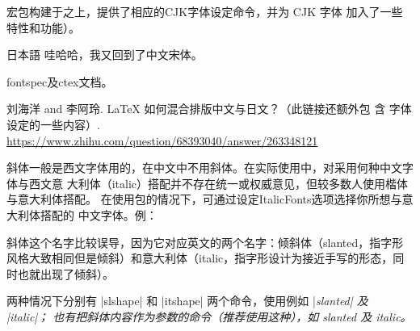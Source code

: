 宏包构建于之上，提供了相应的CJK字体设定命令，并为 CJK 字体
加入了一些特性和功能）。
\begin{texlist}


  \newCJKfontfamily{} %
  \gothic 日本語
  \songti 哇哈哈，我又回到了中文宋体。
\end{texlist}

\begin{reference}
  \item fontspec及ctex文档。
  \item 刘海洋 and 李阿玲. \LaTeX{} 如何混合排版中文与日文？（此链接还额外包
    含\pTeX{} 字体设定的一些内容）.
    \url{https://www.zhihu.com/question/68393040/answer/263348121}
\end{reference}



斜体一般是西文字体用的，在中文中不用斜体。在实际使用中，对采用何种中文字体与西文意
大利体（italic）搭配并不存在统一或权威意见，但较多数人使用楷体与意大利体搭配。
在使用包的情况下，可通过设定ItalicFonts选项选择你所想与意大利体搭配的
中文字体。例：
\begin{texlist}
\end{texlist}

斜体这个名字比较误导，因为它对应英文的两个名字：倾斜体（slanted，指字形风格大致相同但是倾斜）和意大利体（italic，指字形设计为接近手写的形态，同时也就出现了倾斜）。

两种情况下分别有 |slshape| 和 |itshape| 两个命令，使用例如 |\slshape slanted| 及 |\itshape italic|；
也有把斜体内容作为参数的命令（推荐使用这种），如 \textsl{slanted} 及 \textit{italic}。



